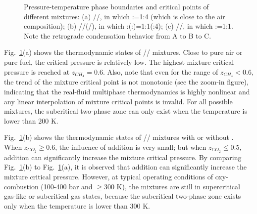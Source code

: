     \begin{figure}[htb]
        \centering



        \caption{Pressure-temperature phase boundaries and critical points of different mixtures: (a) //, in which :=1:4 (which is close to the air composition); (b) //(/), in which :(:)=1:1(:4); (c) //, in which :=1:1. Note the retrograde condensation behavior from A to B to C.}
        \label{v4}
    \end{figure}

Fig.~\ref{v4}(a) shows the thermodynamic states of // mixtures. Close to pure air or pure fuel, the critical pressure is relatively low. The highest mixture critical pressure is reached %
at $z_{CH_4}=0.6$. Also, note that even for the range of $z_{CH_4}<0.6$, the trend of the mixture critical point is not monotonic (see the zoom-in figure), indicating that the real-fluid multiphase thermodynamics is highly nonlinear and any linear interpolation of mixture critical points is invalid. For all possible mixtures, the subcritical two-phase zone can only exist when the temperature is lower than 200 K. %

Fig.~\ref{v4}(b) shows the thermodynamic states of // mixtures with or without . When $z_{CO_2}\geq0.6$, the influence of  addition is very small; but when $z_{CO_2}\leq0.5$,  addition can significantly increase the mixture critical pressure. By comparing Fig.~\ref{v4}(b) to Fig.~\ref{v4}(a), it is observed that  addition can significantly increase the mixture critical pressure. However, at typical operating conditions of  oxy-combustion (100-400 bar and $\ge300$ K), the mixtures are still in supercritical gas-like or subcritical gas states, because the subcritical two-phase zone exists only when the temperature is lower than 300 K.

